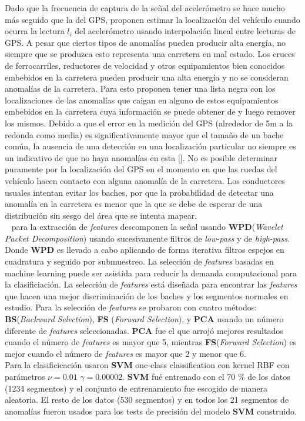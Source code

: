 Dado que la frecuencia de captura de la señal del acelerómetro se hace mucho más seguido que la del GPS, proponen estimar la localización del vehículo
cuando ocurra la lectura $l_i$ del acelerómetro usando interpolación lineal entre lecturas de GPS. A pesar que ciertos tipos de anomalías pueden producir
alta energía, no siempre que se produzca esto representa una carretera en mal estado. Los cruces de ferrocarriles, reductores de velocidad y otros
equipamientos bien conocidos embebidos en la carretera pueden producir una alta energía y no se consideran anomalías de la carretera. Para esto proponen
tener una lista negra con los localizaciones de las anomalías que caigan en alguno de estos equipamientos embebidos en la carretera cuya información se
puede obtener de y luego remover los mismos. Debido a que el error en la medición del GPS (alrededor de 5m a la redonda como media) es significativamente
mayor que el tamaño de un bache común, la ausencia de una detección en una localización particular no siempre es un indicativo de que no haya anomalías en
esta []. No es posible determinar puramente por la localización del GPS en el momento en que las ruedas del vehículo hacen contacto con alguna anomalía de
la carretera. Los conductores usuales intentan evitar los baches, por que la probabilidad de detectar una anomalía en la carretera es menor que la que se
debe de esperar de una distribución sin sesgo del área que se intenta mapear.\\

~\parencite{cong2013applying} para la extracción de \emph{features} descomponen la señal usando \textbf{WPD}(\emph{Wavelet Packet Decomposition}) usando
sucesivamente filtros de \emph{low-pass} y de \emph{high-pass}. Donde \textbf{WPD} es llevado a cabo aplicando de forma iterativa filtros espejos en
cuadratura y seguido por submuestreo. La selección de \emph{features} basadas en machine learning puede ser asistida para reducir la demanda computacional
para la clasificiación. La selección de \emph{features} está diseñada para encontrar las \emph{features} que hacen una mejor discriminación de los baches
y los segmentos normales en estudio. Para la selección de \emph{features} se probaron con cuatro métodos: \textbf{BS}(\emph{Backward Selection}), \textbf{FS}
(\emph{Forward Selection}),  y \textbf{PCA} usando un número diferente de \emph{features} seleccionadas. \textbf{PCA} fue el que
arrojó mejores resultados cuando el número de \emph{features} es mayor que 5, mientras \textbf{FS}(\emph{Forward Selection}) es mejor cuando el número de
\emph{features} es mayor que 2 y menor que 6.\\
Para la clasificicación usaron \textbf{SVM} one-class classification con kernel RBF con parámetros  $\nu = 0.01$  $\gamma = 0.00002$. \textbf{SVM} fué
entrenado con el 70 \%  de los datos (1234 segmentos) y el conjunto de entrenamiento fue escogido de manera aleatoria. El resto de los datos  (530 segmentos)
y en todos los 21 segmentos de anomalías fueron usados para los tests de precisión del modelo \textbf{SVM} construido.\\

